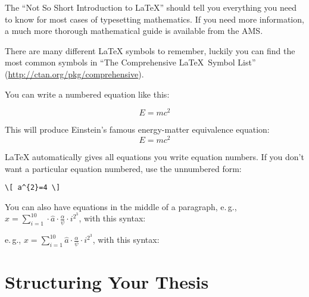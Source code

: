 The \enquote{Not So Short Introduction to LaTeX} should tell you everything you need to know for most cases of typesetting mathematics. If you need more information, a much more thorough mathematical guide is available from the AMS.

There are many different LaTeX symbols to remember, luckily you can find the most common symbols in ``The Comprehensive \LaTeX~Symbol List'' (\url{http://ctan.org/pkg/comprehensive}).

You can write a numbered equation like this:
\begin{latex}
\begin{equation}
E = mc^{2}
\label{eqn:Einstein}
\end{equation}
\end{latex}

This will produce Einstein's famous energy-matter equivalence equation:
\begin{equation}
E = mc^{2}
\label{eqn:Einstein}
\end{equation}

LaTeX automatically gives all equations you write equation numbers. If you don't want a particular equation numbered, use the unnumbered form:
\begin{verbatim}
\[ a^{2}=4 \]
\end{verbatim}

You can also have equations in the middle of a paragraph, e.\,g., \( x = \sum_{i=1}^{10} \cdot \hat{a} \cdot \frac{\alpha}{\psi} \cdot i^{2^3} \), with this syntax: 
\begin{latex}
e.\,g., \( x = \sum_{i=1}^{10} \hat{a} \cdot \frac{\alpha}{\psi} \cdot i^{2^3} \), with this syntax:
\end{latex}


\section{Structuring Your Thesis}

